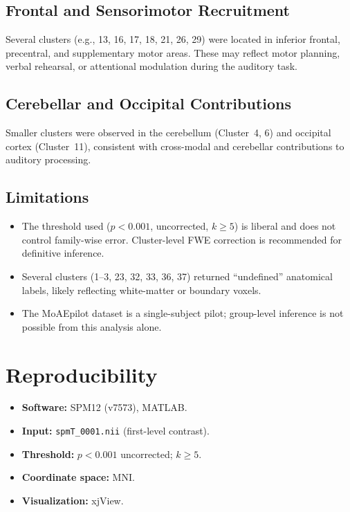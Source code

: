 \documentclass[11pt,a4paper]{article}
\begin{document}
\subsection{Frontal and Sensorimotor Recruitment}
Several clusters (e.g., 13, 16, 17, 18, 21, 26, 29) were located in inferior frontal, precentral, and supplementary motor areas. These may reflect motor planning, verbal rehearsal, or attentional modulation during the auditory task.

\subsection{Cerebellar and Occipital Contributions}
Smaller clusters were observed in the cerebellum (Cluster~4, 6) and occipital cortex (Cluster~11), consistent with cross-modal and cerebellar contributions to auditory processing.

\subsection{Limitations}
\begin{itemize}[leftmargin=1.2em]
    \item The threshold used ($p < 0.001$, uncorrected, $k \geq 5$) is liberal and does not control family-wise error. Cluster-level FWE correction is recommended for definitive inference.
    \item Several clusters (1--3, 23, 32, 33, 36, 37) returned ``undefined'' anatomical labels, likely reflecting white-matter or boundary voxels.
    \item The MoAEpilot dataset is a single-subject pilot; group-level inference is not possible from this analysis alone.
\end{itemize}

\section{Reproducibility}

\begin{itemize}[leftmargin=1.2em]
    \item \textbf{Software:} SPM12 (v7573), MATLAB.
    \item \textbf{Input:} \texttt{spmT\_0001.nii} (first-level contrast).
    \item \textbf{Threshold:} $p < 0.001$ uncorrected; $k \geq 5$.
    \item \textbf{Coordinate space:} MNI.
    \item \textbf{Visualization:} xjView.
\end{itemize}
\end{document}
